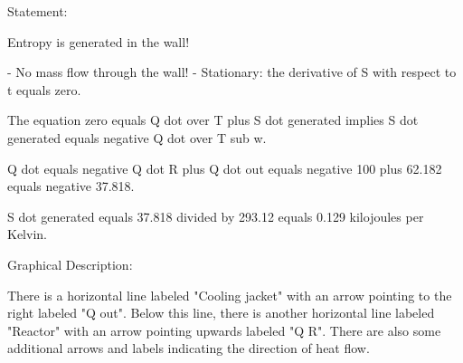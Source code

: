 Statement:

Entropy is generated in the wall!

- No mass flow through the wall!
- Stationary: the derivative of S with respect to t equals zero.

The equation zero equals Q dot over T plus S dot generated implies S dot generated equals negative Q dot over T sub w.

Q dot equals negative Q dot R plus Q dot out equals negative 100 plus 62.182 equals negative 37.818.

S dot generated equals 37.818 divided by 293.12 equals 0.129 kilojoules per Kelvin.

Graphical Description:

There is a horizontal line labeled "Cooling jacket" with an arrow pointing to the right labeled "Q out". Below this line, there is another horizontal line labeled "Reactor" with an arrow pointing upwards labeled "Q R". There are also some additional arrows and labels indicating the direction of heat flow.